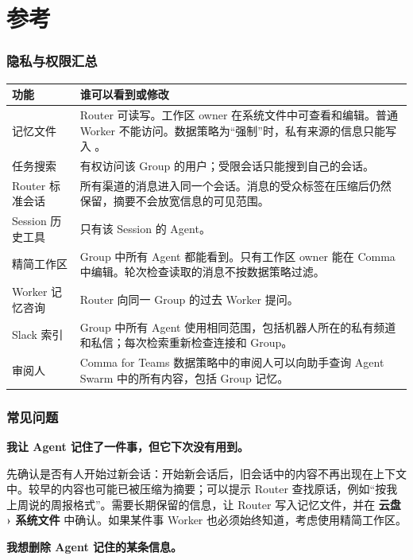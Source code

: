 \documentclass[UTF8,a4paper,11pt]{ctexart}
\begin{document}
\clearpage
\part{参考}

\section{隐私与权限汇总}

\begin{longtable}{P{3.4cm}P{10.4cm}}
\toprule
功能 & 谁可以看到或修改 \\
\midrule
\endhead
记忆文件 & Router 可读写。工作区 owner 在系统文件中可查看和编辑。普通 Worker 不能访问。数据策略为“强制”时，私有来源的信息只能写入 。 \\
任务搜索 & 有权访问该 Group 的用户；受限会话只能搜到自己的会话。 \\
Router 标准会话 & 所有渠道的消息进入同一个会话。消息的受众标签在压缩后仍然保留，摘要不会放宽信息的可见范围。 \\
Session 历史工具 & 只有该 Session 的 Agent。 \\
精简工作区 & Group 中所有 Agent 都能看到。只有工作区 owner 能在 Comma 中编辑。轮次检查读取的消息不按数据策略过滤。 \\
Worker 记忆咨询 & Router 向同一 Group 的过去 Worker 提问。 \\
Slack 索引 & Group 中所有 Agent 使用相同范围，包括机器人所在的私有频道和私信；每次检索重新检查连接和 Group。 \\
审阅人 & Comma for Teams 数据策略中的审阅人可以向助手查询 Agent Swarm 中的所有内容，包括 Group 记忆。 \\
\bottomrule
\end{longtable}

\section{常见问题}

\textbf{我让 Agent 记住了一件事，但它下次没有用到。}

先确认是否有人开始过新会话：开始新会话后，旧会话中的内容不再出现在上下文中。较早的内容也可能已被压缩为摘要；可以提示 Router 查找原话，例如“按我上周说的周报格式”。需要长期保留的信息，让 Router 写入记忆文件，并在 \textbf{云盘 › 系统文件} 中确认。如果某件事 Worker 也必须始终知道，考虑使用精简工作区。

\textbf{我想删除 Agent 记住的某条信息。}
\end{document}
